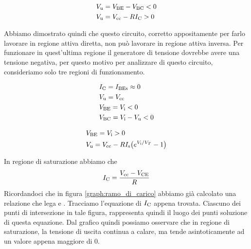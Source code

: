 \documentclass[../elettronica]{subfiles}
\begin{document}
\begin{tcolorbox}[title=Regione attiva inversa]
    \begin{align*}
        &\vu = \vbe - \vbc < 0\\
        &\vu = \V{cc} - R\I{C} > 0
    \end{align*}
\end{tcolorbox}

\noindent
Abbiamo dimostrato quindi che questo circuito, corretto appositamente per farlo lavorare in regione attiva diretta,
non può lavorare in regione attiva inversa. Per funzionare in quest'ultima regione il generatore di tensione  dovrebbe
avere una tensione negativa, per questo motivo per analizzare di questo circuito, consideriamo solo
tre regioni di funzionamento.

\noindent
\begin{minipage}{.49\textwidth}
    \begin{tcolorbox}[title=Regione di interdizione]
        \vspace{-1.5em}
        \begin{align*}
        &\I{C} = \I{BEs} \approx 0\\
        &\vu = \V{cc}\\
        &\vbe = \vi < 0\\
        &\vbc = \vi - \vu < 0
        \end{align*}
    \end{tcolorbox}
\end{minipage}
\begin{minipage}{.49\textwidth}
    \begin{tcolorbox}[title=Attiva diretta]
        \begin{align*}
        &\vbe = \vi > 0\\
        &\vu = \V{cc} - R \diodecurrent[\I{s}]{\vi}\\
        \end{align*}
    \end{tcolorbox}
\end{minipage}

\noindent
In regione di saturazione abbiamo che
\begin{align*}
    \I{C} = \frac{\V{cc} - \vce}{R}
\end{align*}
Ricordandoci che in figura \ref{graph:ramo_di_carico} abbiamo già calcolato una relazione che lega  e \vce.
Tracciamo l'equazione di $\I{C}$ appena trovata. Ciascuno dei punti di intersezione in tale figura, rappresenta
quindi il luogo dei punti soluzione di questa equazione.
Dal grafico quindi possiamo osservare che in regione di saturazione, la tensione di uscita continua a calare, ma
tende asintoticamente ad un valore appena maggiore di 0.
\end{document}
